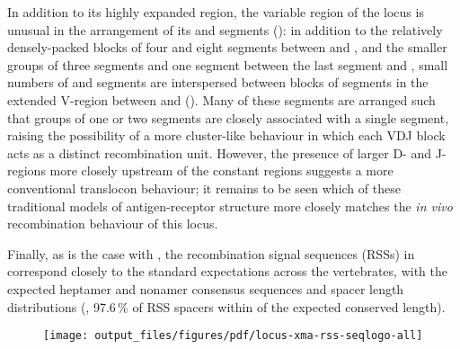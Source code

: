 In addition to its highly expanded \vh region, the variable region of the \Xma locus is unusual in the arrangement of its \dh and \jh segments (): in addition to the relatively densely-packed blocks of four \dh and eight \jh segments between  and , and the smaller groups of three \dh segments and one \jh segment between the last \vh segment and , small numbers of \dh and \jh segments are interspersed between blocks of \vh segments in the extended V-region between  and  (). Many of these segments are arranged such that groups of one or two \dh segments are closely associated with a single \jh segment, raising the possibility of a more cluster-like behaviour in which each VDJ block acts as a distinct recombination unit. However, the presence of larger D- and J-regions more closely upstream of the constant regions suggests a more conventional translocon behaviour; it remains to be seen which of these traditional models of antigen-receptor structure more closely matches the \textit{in vivo} recombination behaviour of this locus.
		
Finally, as is the case with \Nfu, the recombination signal sequences (RSSs) in \Xma \igh{} correspond closely to the standard expectations across the vertebrates, with the expected heptamer and nonamer consensus sequences and spacer length distributions (, 97.6\,\% of RSS spacers within  of the expected conserved length).	

	\begin{figure}
		\begin{subfigure}{0em}
        \label{fig:xma-rss-seqlogo-all-heptamer}
    \end{subfigure}
    \begin{subfigure}{0em}
        \label{fig:xma-rss-seqlogo-all-spacer}
    \end{subfigure}
    \begin{subfigure}{0em}
        \label{fig:xma-rss-seqlogo-all-nonamer}
    \end{subfigure}
	\texttt{[image: output\_files/figures/pdf/locus-xma-rss-seqlogo-all]}
	\label{fig:xma-rss-seqlogo-all}
	\vspace{1em}
	\end{figure}
	
